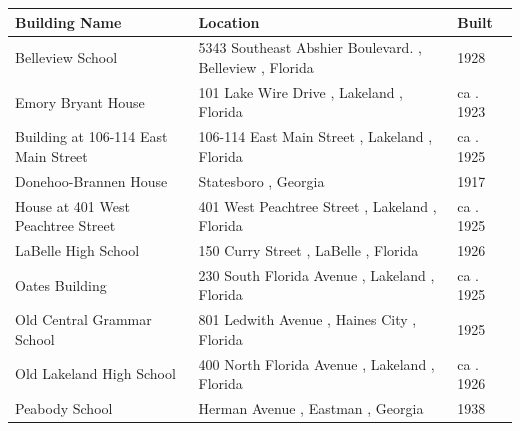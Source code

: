 \documentclass{article}
\begin{document}
\begin{tabular}{lll}
\toprule
Building Name & Location & Built \\
\midrule
Belleview School & 5343 Southeast Abshier Boulevard. , Belleview , Florida & 1928 \\
Emory Bryant House & 101 Lake Wire Drive , Lakeland , Florida & ca . 1923 \\
Building at 106-114 East Main Street & 106-114 East Main Street , Lakeland , Florida & ca . 1925 \\
Donehoo-Brannen House & Statesboro , Georgia & 1917 \\
House at 401 West Peachtree Street & 401 West Peachtree Street , Lakeland , Florida & ca . 1925 \\
LaBelle High School & 150 Curry Street , LaBelle , Florida & 1926 \\
Oates Building & 230 South Florida Avenue , Lakeland , Florida & ca . 1925 \\
Old Central Grammar School & 801 Ledwith Avenue , Haines City , Florida & 1925 \\
Old Lakeland High School & 400 North Florida Avenue , Lakeland , Florida & ca . 1926 \\
Peabody School & Herman Avenue , Eastman , Georgia & 1938 \\
\bottomrule
\end{tabular}
\end{document}
